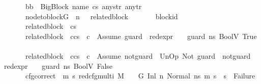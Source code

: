 \begin{isabellebody}
\ \ \ \ \ \ \ {\isachardoublequoteopen}bb\ {\isacharequal}{\kern0pt}\ {\isacharparenleft}{\kern0pt}BigBlock\ name\ cs{}\ any{\isacharunderscore}{\kern0pt}str\ any{\isacharunderscore}{\kern0pt}tr{\isacharparenright}{\kern0pt}{\isachardoublequoteclose}\isanewline
\ \ \ \ \ \ \ {\isachardoublequoteopen}node{\isacharunderscore}{\kern0pt}to{\isacharunderscore}{\kern0pt}block{\isacharparenleft}{\kern0pt}G{\isacharparenright}{\kern0pt}\ {\isacharbang}{\kern0pt}\ n\ \ {\isacharequal}{\kern0pt}\ related{\isacharunderscore}{\kern0pt}block{\isachardoublequoteclose}\isanewline
\ \ \ \ \ \ \ block{\isacharunderscore}{\kern0pt}id{\isacharcolon}{\kern0pt}\isanewline
\ \ \ \ \ \ \ {\isachardoublequoteopen}{\isacharparenleft}{\kern0pt}related{\isacharunderscore}{\kern0pt}block\ {\isacharequal}{\kern0pt}\ cs{}{\isacharparenright}{\kern0pt}\ {\isasymor}\ \isanewline
\ \ \ \ \ \ \ {\isacharparenleft}{\kern0pt}related{\isacharunderscore}{\kern0pt}block\ {\isacharequal}{\kern0pt}\ c{\isacharhash}{\kern0pt}cs{}{\isacharparenright}{\kern0pt}\ {\isasymand}\ c\ {\isacharequal}{\kern0pt}\ Assume\ guard\ {\isasymand}\ {\isacharparenleft}{\kern0pt}red{\isacharunderscore}{\kern0pt}expr\ {\isasymLambda}\ {\isasymGamma}\ {\isasymOmega}\ guard\ ns{}\ {\isacharparenleft}{\kern0pt}BoolV\ True{\isacharparenright}{\kern0pt}{\isacharparenright}{\kern0pt}\ {\isasymor}\ \isanewline
\ \ \ \ \ \ \ {\isacharparenleft}{\kern0pt}related{\isacharunderscore}{\kern0pt}block\ {\isacharequal}{\kern0pt}\ c{\isacharhash}{\kern0pt}cs{}{\isacharparenright}{\kern0pt}\ {\isasymand}\ c\ {\isacharequal}{\kern0pt}\ Assume\ not{\isacharunderscore}{\kern0pt}guard\ {\isasymand}\ {\isacharparenleft}{\kern0pt}UnOp\ Not\ guard\ {\isasymsim}\ not{\isacharunderscore}{\kern0pt}guard{\isacharparenright}{\kern0pt}\ {\isasymand}\ {\isacharparenleft}{\kern0pt}red{\isacharunderscore}{\kern0pt}expr\ {\isasymLambda}\ {\isasymGamma}\ {\isasymOmega}\ guard\ ns{}\ {\isacharparenleft}{\kern0pt}BoolV\ False{\isacharparenright}{\kern0pt}{\isacharparenright}{\kern0pt}{\isachardoublequoteclose}\isanewline
\ \ \ \ \ \ \ cfg{\isacharunderscore}{\kern0pt}correct{\isacharcolon}{\kern0pt}\ {\isachardoublequoteopen}{\isacharparenleft}{\kern0pt}{\isasymAnd}\ m{}\ s{}{\isachardot}{\kern0pt}\ {\isacharparenleft}{\kern0pt}{\isacharparenleft}{\kern0pt}red{\isacharunderscore}{\kern0pt}cfg{\isacharunderscore}{\kern0pt}multi\ M\ {\isasymLambda}\ {\isasymGamma}\ {\isasymOmega}\ G\ {\isacharparenleft}{\kern0pt}Inl\ n{\isacharcomma}{\kern0pt}\ Normal\ ns{}{\isacharparenright}{\kern0pt}\ {\isacharparenleft}{\kern0pt}m{}{\isacharcomma}{\kern0pt}\ s{}{\isacharparenright}{\kern0pt}{\isacharparenright}{\kern0pt}\ {\isasymLongrightarrow}\ {\isacharparenleft}{\kern0pt}s{}\ {\isasymnoteq}\ Failure{\isacharparenright}{\kern0pt}{\isacharparenright}{\kern0pt}{\isacharparenright}{\kern0pt}{\isachardoublequoteclose}\isanewline

\end{isabellebody}
